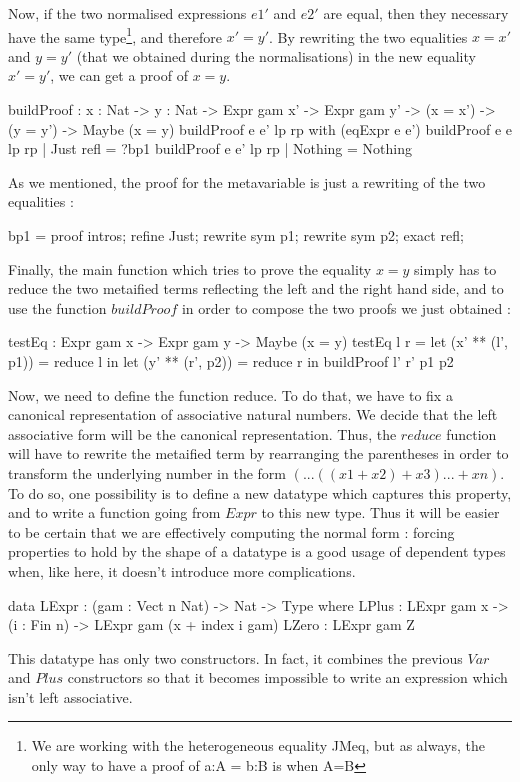 \documentclass{sigplanconf}
\begin{document}
Now, if the two normalised expressions $e1'$ and $e2'$ are equal, then they necessary have the same type\footnote{We are working with the heterogeneous equality JMeq, but as always, the only way to have a proof of a:A = b:B is when A=B}, and therefore $x'=y'$.
By rewriting the two equalities $x=x'$ and $y=y'$ (that we obtained during the normalisations) in the new equality $x'=y'$, we can get a proof of $x=y$.

\begin{code}[caption=Building the desired proof with the two proofs of equality, captionpos=b, label=lst1:haskell2]
buildProof : {x : Nat} -> {y : Nat} 
       -> Expr gam x' -> Expr gam y' 
       -> (x = x') -> (y = y') 
       -> Maybe (x = y)
buildProof e e' lp rp with (eqExpr e e')
  buildProof e e lp rp | Just refl = ?bp1
  buildProof e e' lp rp | Nothing = Nothing
\end{code}

As we mentioned, the proof for the metavariable is just a rewriting of the two equalities :

\begin{code}[caption=buildProof metavariable, captionpos=b, label=lst1:haskell2]
  bp1 = proof {
  intros;
  refine Just;
  rewrite sym p1;
  rewrite sym p2;
  exact refl;
}  
\end{code}
Finally, the main function which tries to prove the equality $x=y$ simply has to reduce the two metaified terms reflecting the left and the right hand side, and to use the function $buildProof$ in order to compose the two proofs we just obtained :
\begin{code}[caption=testEq, captionpos=b, label=lst1:haskell2]
  testEq : Expr gam x -> Expr gam y 
           -> Maybe (x = y)
  testEq l r = 
     let (x' ** (l', p1)) = reduce l in 
     let (y' ** (r', p2)) = reduce r in
        buildProof l' r' p1 p2
\end{code}
Now, we need to define the function reduce. To do that, we have to fix a canonical representation of associative natural numbers. We decide that the left associative form will be the canonical representation. Thus, the $reduce$ function will have to rewrite the metaified term by rearranging the parentheses in order to transform the underlying number in the form $(...((x1 + x2) + x3) ... + xn)$. To do so, one possibility is to define a new datatype which captures this property, and to write a function going from $Expr$ to this new type. Thus it will be easier to be certain that we are effectively computing the normal form : forcing properties to hold by the shape of a datatype is a good usage of dependent types when, like here, it doesn't introduce more complications.
\begin{code}[caption=Reflected left associative numbers, captionpos=b, label=lst1:haskell2]
data LExpr : (gam : Vect n Nat) -> Nat 
             -> Type where
     LPlus : LExpr gam x -> (i : Fin n) 
             -> LExpr gam (x + index i gam)
     LZero : LExpr gam Z
\end{code}
This datatype has only two constructors. In fact, it combines the previous $Var$ and $Plus$ constructors so that it becomes impossible to write an expression which isn't left associative.
 
\end{document}
